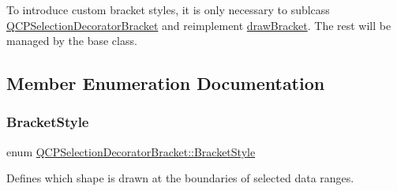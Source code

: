To introduce custom bracket styles, it is only necessary to sublcass \hyperlink{class_q_c_p_selection_decorator_bracket}{Q\+C\+P\+Selection\+Decorator\+Bracket} and reimplement \hyperlink{class_q_c_p_selection_decorator_bracket_a57b65b5508d5bd0f27c9318f3d4646be}{draw\+Bracket}. The rest will be managed by the base class. 

\subsection{Member Enumeration Documentation}
\mbox{\label{class_q_c_p_selection_decorator_bracket_aa6d18517ec0553575bbef0de4252336e}} 
\subsubsection{\texorpdfstring{Bracket\+Style}{BracketStyle}}
{\footnotesize\ttfamily enum \hyperlink{class_q_c_p_selection_decorator_bracket_aa6d18517ec0553575bbef0de4252336e}{Q\+C\+P\+Selection\+Decorator\+Bracket\+::\+Bracket\+Style}}

Defines which shape is drawn at the boundaries of selected data ranges.

